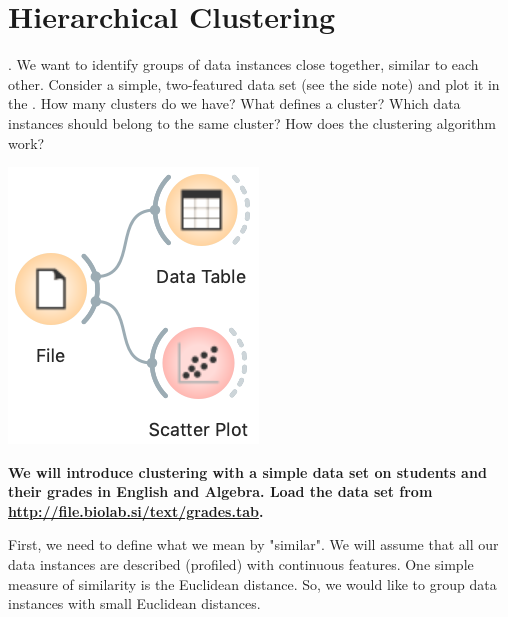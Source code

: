 \chapter{Hierarchical Clustering}
\label{ch:hierarchical_clustering}

. We want to identify groups of data instances close together, similar to each other. Consider a simple, two-featured data set (see the side note) and plot it in the . How many clusters do we have? What defines a cluster? Which data instances should belong to the same cluster? How does the clustering algorithm work?

\begin{marginfigure}
    \includegraphics[scale=0.4]{workflow_scatterplot.png}
    \caption{\textbf{\textsf{We will introduce clustering with a simple data set on students and their grades in English and Algebra. Load the data set from \url{http://file.biolab.si/text/grades.tab}.}}}
\end{marginfigure}

First, we need to define what we mean by "similar". We will assume that all our data instances are described (profiled) with continuous features. One simple measure of similarity is the Euclidean distance. So, we would like to group data instances with small Euclidean distances.

